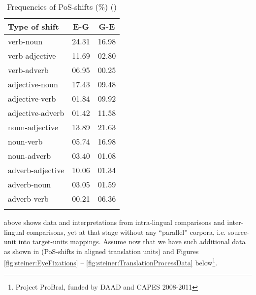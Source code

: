 \documentclass[output=paper]{LSP/langsci}
\begin{document}
\begin{exe}
\begin{exe}
\begin{exe}
\begin{exe}
\begin{exe}
\begin{table}[b]
\begin{tabularx}{\textwidth}{XSS}
\lsptoprule
 {Type of shift} & {E-G} & {G-E}\\
 \midrule
verb-noun & 24.31 & 16.98\\
verb-adjective & 11.69 & 02.80\\
verb-adverb & 06.95 & 00.25\\
adjective-noun & 17.43 & 09.48\\
adjective-verb & 01.84 & 09.92\\
adjective-adverb & 01.42 & 11.58\\
noun-adjective & 13.89 & 21.63\\
noun-verb & 05.74 & 16.98\\
noun-adverb & 03.40 & 01.08\\
adverb-adjective & 10.06 & 01.34\\
adverb-noun & 03.05 & 01.59\\
adverb-verb & 00.21 & 06.36\\
\lspbottomrule
\end{tabularx}
\caption{Frequencies of PoS-shifts (\%) (\citealt[116]{AlvesEtAl2010})}
\label{tab:steiner:FrequenciesOfPOS}
\end{table}


 above shows data and interpretations from intra-lingual comparisons and inter-lingual comparisons, yet at that stage without any ``parallel'' corpora, i.e. source-unit into target-units mappings. Assume now that we have such additional data as shown in  (PoS-shifts in aligned translation units) and Figures \ref{fig:steiner:EyeFixations} -- \ref{fig:steiner:TranslationProcessData} below\footnote{Project ProBral, funded by DAAD and CAPES 2008-2011}.


\end{exe}
\end{exe}
\end{exe}
\end{exe}
\end{exe}
\end{document}
